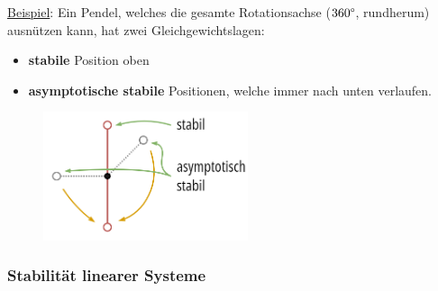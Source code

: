 \documentclass[
  10pt,
  a4paper,
]{article}
\providecommand{\tightlist}{%
  \setlength{\itemsep}{0pt}\setlength{\parskip}{0pt}}\usepackage{longtable,booktabs,array}
\numberwithin{equation}{section}
\begin{document}
\begin{multicols}{2}
\ul{Beispiel}: Ein Pendel, welches die gesamte Rotationsachse
(\(360\degree\), rundherum) ausnützen kann, hat zwei
Gleichgewichtslagen:

\begin{itemize}
\tightlist
\item
  \textbf{stabile} Position oben
\item
  \textbf{asymptotische stabile} Positionen, welche immer nach unten
  verlaufen.
\end{itemize}

\begin{figure}[H]

{\centering \includegraphics[width=6cm,height=\textheight]{images/dynamik/stationary_point.png}

}

\end{figure}

\hypertarget{stabilituxe4t-linearer-systeme}{%
\subsubsection{Stabilität linearer
Systeme}\label{stabilituxe4t-linearer-systeme}}

\begin{center}\end{center}


\end{multicols}
\end{document}
